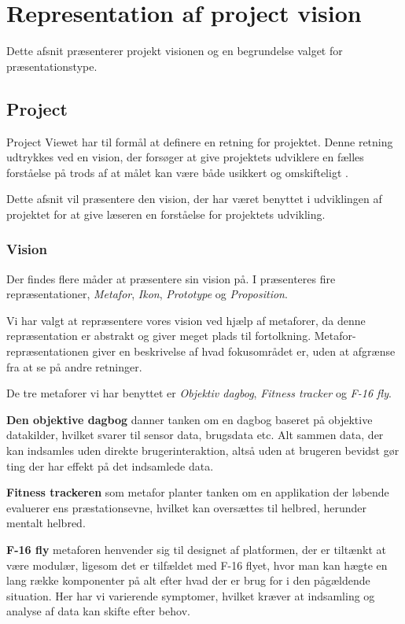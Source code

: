 \section{Representation af project vision}
Dette afsnit præsenterer projekt visionen og en begrundelse valget for præsentationstype.
\subsection{Project}
Project Viewet har til formål at definere en retning for projektet.
Denne retning udtrykkes ved en vision, der forsøger at give projektets udviklere en fælles forståelse på trods af at målet kan være både usikkert og omskifteligt \cite[Kapitel 15 - Project]{art:essence}.

Dette afsnit vil præsentere den vision, der har været benyttet i udviklingen af projektet for at give læseren en forståelse for projektets udvikling.

\subsubsection{Vision}\label{vision}
Der findes flere måder at præsentere sin vision på. 
I \citet[Kapitel 24 - Representation]{art:essence} præsenteres fire repræsentationer, \textit{Metafor}, \textit{Ikon}, \textit{Prototype} og \textit{Proposition}.

Vi har valgt at repræsentere vores vision ved hjælp af metaforer, da denne repræsentation er abstrakt og giver meget plads til fortolkning.
Metafor-repræsentationen giver en beskrivelse af hvad fokusområdet er, uden at afgrænse fra at se på andre retninger.

De tre metaforer vi har benyttet er \textit{Objektiv dagbog}, \textit{Fitness tracker} og \textit{F-16 fly}.

\textbf{Den objektive dagbog} danner tanken om en dagbog baseret på objektive datakilder, hvilket svarer til sensor data, brugsdata etc.
Alt sammen data, der kan indsamles uden direkte brugerinteraktion, altså uden at brugeren bevidst gør ting der har effekt på det indsamlede data.

\textbf{Fitness trackeren} som metafor planter tanken om en applikation der løbende evaluerer ens præstationsevne, hvilket kan oversættes til helbred, herunder mentalt helbred.

\textbf{F-16 fly}\label{vision::fly} metaforen henvender sig til designet af platformen, der er tiltænkt at være modulær, ligesom det er tilfældet med F-16 flyet, hvor man kan hægte en lang række komponenter på alt efter hvad der er brug for i den pågældende situation.
Her har vi varierende symptomer, hvilket kræver at indsamling og analyse af data kan skifte efter behov.

